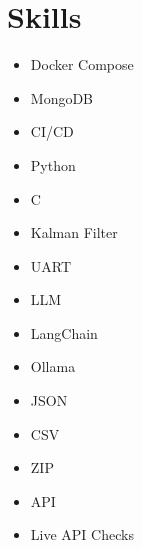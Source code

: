 \documentclass[11pt,a4paper]{article}
\begin{document}
\section*{Skills}
\begin{itemize}
  \item Docker Compose
  \item MongoDB
  \item CI/CD
  \item Python
  \item C
  \item Kalman Filter
  \item UART
  \item LLM
  \item LangChain
  \item Ollama
  \item JSON
  \item CSV
  \item ZIP
  \item API
  \item Live API Checks
\end{itemize}
\end{document}
